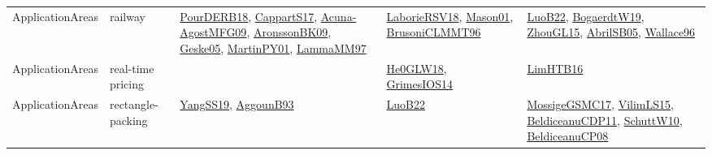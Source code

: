 {\begin{longtable}{lp{3cm}>{\raggedright}p{6cm}>{\raggedright}p{6cm}p{8cm}}
ApplicationAreas & railway & \href{articles/PourDERB18.pdf}{PourDERB18}\cite{PourDERB18}, \href{papers/CappartS17.pdf}{CappartS17}\cite{CappartS17}, \href{papers/Acuna-AgostMFG09.pdf}{Acuna-AgostMFG09}\cite{Acuna-AgostMFG09}, \href{papers/AronssonBK09.pdf}{AronssonBK09}\cite{AronssonBK09}, \href{papers/Geske05.pdf}{Geske05}\cite{Geske05}, \href{articles/MartinPY01.pdf}{MartinPY01}\cite{MartinPY01}, \href{articles/LammaMM97.pdf}{LammaMM97}\cite{LammaMM97} & \href{articles/LaborieRSV18.pdf}{LaborieRSV18}\cite{LaborieRSV18}, \href{articles/Mason01.pdf}{Mason01}\cite{Mason01}, \href{papers/BrusoniCLMMT96.pdf}{BrusoniCLMMT96}\cite{BrusoniCLMMT96} & \href{papers/LuoB22.pdf}{LuoB22}\cite{LuoB22}, \href{papers/BogaerdtW19.pdf}{BogaerdtW19}\cite{BogaerdtW19}, \href{papers/ZhouGL15.pdf}{ZhouGL15}\cite{ZhouGL15}, \href{papers/AbrilSB05.pdf}{AbrilSB05}\cite{AbrilSB05}, \href{articles/Wallace96.pdf}{Wallace96}\cite{Wallace96}\\
ApplicationAreas & real-time pricing &  & \href{papers/He0GLW18.pdf}{He0GLW18}\cite{He0GLW18}, \href{articles/GrimesIOS14.pdf}{GrimesIOS14}\cite{GrimesIOS14} & \href{papers/LimHTB16.pdf}{LimHTB16}\cite{LimHTB16}\\
ApplicationAreas & rectangle-packing & \href{papers/YangSS19.pdf}{YangSS19}\cite{YangSS19}, \href{articles/AggounB93.pdf}{AggounB93}\cite{AggounB93} & \href{papers/LuoB22.pdf}{LuoB22}\cite{LuoB22} & \href{papers/MossigeGSMC17.pdf}{MossigeGSMC17}\cite{MossigeGSMC17}, \href{papers/VilimLS15.pdf}{VilimLS15}\cite{VilimLS15}, \href{articles/BeldiceanuCDP11.pdf}{BeldiceanuCDP11}\cite{BeldiceanuCDP11}, \href{papers/SchuttW10.pdf}{SchuttW10}\cite{SchuttW10}, \href{papers/BeldiceanuCP08.pdf}{BeldiceanuCP08}\cite{BeldiceanuCP08}\\

\end{longtable}}
